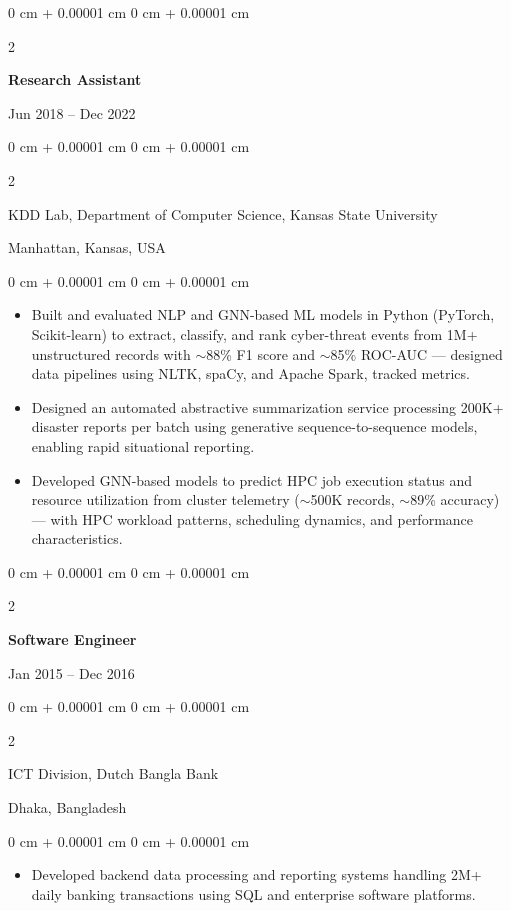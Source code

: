 \documentclass[10pt, letterpaper]{article}
\newenvironment{highlights}{
    \begin{itemize}[
        topsep=0.10 cm,
        parsep=0.10 cm,
        partopsep=0pt,
        itemsep=0pt,
        leftmargin=0 cm + 10pt
    ]
}{
    \end{itemize}
} %
\newenvironment{onecolentry}{
    \begin{adjustwidth}{
        0 cm + 0.00001 cm
    }{
        0 cm + 0.00001 cm
    }
}{
    \end{adjustwidth}
} %
\newenvironment{twocolentry}[2][]{
    \onecolentry
    \def\secondColumn{#2}
    \setcolumnwidth{\fill, 4.5 cm}
    \begin{paracol}{2}
}{
    \switchcolumn \raggedleft \secondColumn
    \end{paracol}
    \endonecolentry
} %
\begin{document}
    \vspace{1mm}

    \begin{twocolentry}{Jun 2018 -- Dec 2022}
        \textbf{Research Assistant}
    \end{twocolentry}
    \begin{twocolentry}{Manhattan, Kansas, USA}
       KDD Lab, Department of Computer Science, Kansas State University
    \end{twocolentry}
    \vspace{0.10 cm}
    \begin{onecolentry}
        \begin{highlights}
            \item Built and evaluated NLP and GNN-based ML models in Python (PyTorch, Scikit-learn) to extract, classify, and rank cyber-threat events from 1M+ unstructured records with $\sim$88\% F1 score and $\sim$85\% ROC-AUC — designed data pipelines using NLTK, spaCy, and Apache Spark, tracked metrics.
            \item Designed an automated abstractive summarization service processing 200K+ disaster reports per batch using generative sequence-to-sequence models, enabling rapid situational reporting.
            \item Developed GNN-based models to predict HPC job execution status and resource utilization from cluster telemetry ($\sim$500K records, $\sim$89\% accuracy) — with HPC workload patterns, scheduling dynamics, and performance characteristics.
        \end{highlights}
    \end{onecolentry}

    \vspace{0.1 cm}
    \begin{twocolentry}{Jan 2015 -- Dec 2016}
        \textbf{Software Engineer}
    \end{twocolentry}
    \begin{twocolentry}{Dhaka, Bangladesh}
       ICT Division, Dutch Bangla Bank
    \end{twocolentry}

    \begin{onecolentry}
        \begin{highlights}
            \item Developed backend data processing and reporting systems handling 2M+ daily banking transactions using SQL and enterprise software platforms.
        \end{highlights}
    \end{onecolentry}
\end{document}
